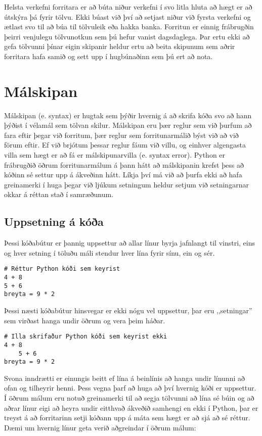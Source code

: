 Helsta verkefni forritara er að búta niður verkefni í svo litla hluta að hægt er að útskýra þá fyrir tölvu.
Ekki búast við því að setjast niður við fyrsta verkefni og ætlast svo til að búa til tölvuleik eða hakka banka.
Forritun er einnig frábrugðin þeirri venjulegu tölvunotkun sem þú hefur vanist dagsdaglega.
Þar ertu ekki að gefa tölvunni þínar eigin skipanir heldur ertu að beita skipunum sem aðrir forritara hafa samið og sett upp í hugbúnaðinn sem þú ert að nota.


\section{Málskipan}

Málskipan (e. syntax) er hugtak sem þýðir hvernig á að skrifa kóða svo að hann þýðist í vélamál sem tölvan skilur. 
Málskipan eru þær reglur sem við þurfum að fara eftir þegar við forritum, þær reglur sem forritunarmálið býst við að við förum eftir. 
Ef við brjótum þessar reglur fáum við villu, og einhver algengasta villa sem hægt er að fá er málskipunarvilla (e. syntax error). 
Python er frábrugðið öðrum forritunarmálum á þann hátt að málskipanin krefst þess að kóðinn sé settur upp á ákveðinn hátt. 
Líkja því má við að þurfa ekki að hafa greinamerki í huga þegar við ljúkum setningum heldur setjum við setningarnar okkar á réttan stað í samræðunum.

\subsection{Uppsetning á kóða}
Þessi kóðabútur er þannig uppsettur að allar línur byrja jafnlangt til vinstri, eins og hver setning í töluðu máli stendur hver lína fyrir sínu, ein og sér.
\begin{lstlisting}[caption=Réttur Python kóði]
# Réttur Python kóði sem keyrist
4 + 8
5 + 6
breyta = 9 * 2
\end{lstlisting}

Þessi næsti kóðabútur hinsvegar er ekki nógu vel uppsettur, þar eru ,,setningar'' sem virðast hanga undir öðrum og vera þeim háðar. 

\begin{lstlisting}[caption=Rangur Python kóði]
# Illa skrifaður Python kóði sem keyrist ekki
4 + 8
	5 + 6
breyta = 9 * 2
\end{lstlisting}

Svona inndrætti er einungis beitt ef lína á beinlínis að hanga undir línunni að ofan og tilheyrir henni. 
Þess vegna þarf að huga að því hvernig kóði er uppsettur. 
Í öðrum málum eru notuð greinamerki til að segja tölvunni að lína sé búin og að aðrar línur eigi að heyra undir eitthvað ákveðið samhengi en ekki í Python, þar er treyst á að forritarinn setji kóðann upp á máta sem hægt er að sjá að sé réttur. 
Dæmi um hvernig línur geta verið aðgreindar í öðrum málum:

